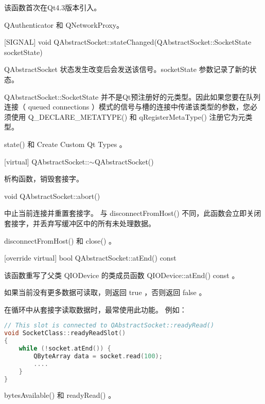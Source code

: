该函数首次在Qt4.3版本引入。

\begin{seeAlso}
QAuthenticator 和 QNetworkProxy。
\end{seeAlso}

[SIGNAL] void
QAbstractSocket::stateChanged(QAbstractSocket::SocketState
socketState)

QAbstractSocket 状态发生改变后会发送该信号。socketState 参数记录了新的状态。

\begin{notice}
QAbstractSocket::SocketState 并不是Qt预注册好的元类型。因此如果您要在队列连接（ queued connections ）模式的信号与槽的连接中传递该类型的参数，您必须使用 Q\_DECLARE\_METATYPE() 和 qRegisterMetaType() 注册它为元类型。
\end{notice}


\begin{seeAlso}
state() 和 Create Custom Qt Types 。
\end{seeAlso}


[virtual] QAbstractSocket::$\sim$QAbstractSocket()

析构函数，销毁套接字。

void QAbstractSocket::abort()

中止当前连接并重置套接字。 与 disconnectFromHost() 不同，此函数会立即关闭套接字，并丢弃写缓冲区中的所有未处理数据。



\begin{seeAlso}
 disconnectFromHost() 和 close() 。
\end{seeAlso}

[override virtual] bool QAbstractSocket::atEnd() const

该函数重写了父类 QIODevice 的类成员函数 QIODevice::atEnd() const 。

如果当前没有更多数据可读取，则返回 true ，否则返回 false 。

在循环中从套接字读取数据时，最常使用此功能。 例如：

\begin{lstlisting}[language=C++]
// This slot is connected to QAbstractSocket::readyRead()
void SocketClass::readyReadSlot()
{
	while (!socket.atEnd()) {
		QByteArray data = socket.read(100);
		....
	}
}
\end{lstlisting}



\begin{seeAlso}
bytesAvailable() 和 readyRead() 。
\end{seeAlso}

